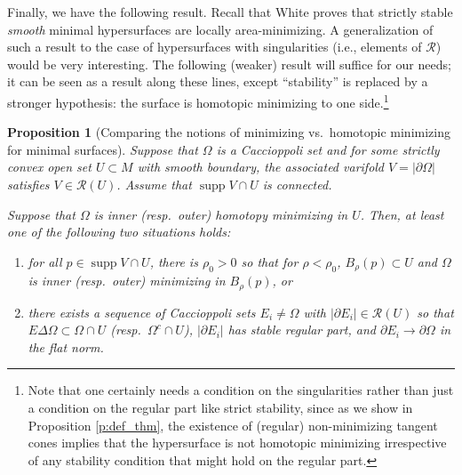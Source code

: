 \documentclass[12pt,twoside]{amsart}
\numberwithin{equation}{section}
\renewcommand{\mathbb}{\varmathbb}
\newtheorem{proposition}[theorem]{Proposition}
\newtheorem{remark}[theorem]{Remark}
\newcommand{\RR}{\mathbb{R}}
\newcommand{\cI}{\mathcal I}
\renewcommand{\cR}{\mathcal R}
\DeclareMathOperator{\supp}{supp}
\newcommand{\eps}{\varepsilon}
\begin{document}





Finally, we have the following result. Recall that White \cite{W} proves that strictly stable  \emph{smooth} minimal hypersurfaces are locally area-minimizing. A generalization of such a result to the case of hypersurfaces with singularities (i.e., elements of $\cR$) would be very interesting. The following (weaker) result will suffice for our needs; it can be seen as a result along these lines, except ``stability'' is replaced by a stronger hypothesis: the surface is homotopic minimizing to one side.\footnote{Note that one certainly needs a condition on the singularities rather than just a condition on the regular part like strict stability, since as we show in Proposition \ref{p:def_thm}, the existence of (regular) non-minimizing tangent cones implies that the hypersurface is not homotopic minimizing irrespective of any stability condition that might hold on the regular part.}

 \begin{proposition}[Comparing the notions of minimizing vs.\ homotopic minimizing for minimal surfaces]\label{prop:min-vs-htpy-min}
Suppose that $\Omega$ is a Caccioppoli set and for some strictly convex open set $U \subset M$ with smooth boundary, the associated varifold $V = |\partial \Omega|$ satisfies $V \in \cR(U)$. Assume that $\supp V \cap U$ is connected. 

Suppose that $\Omega$ is inner (resp.\ outer) homotopy minimizing in $U$. Then, at least one of the following two situations holds:
\begin{enumerate}
\item for all $p \in \supp V \cap U$, there is $\rho_0>0$ so that for $\rho<\rho_0$, $B_\rho(p) \subset U$ and $\Omega$ is inner (resp.\ outer) minimizing in $B_\rho(p)$, or
\item there exists a sequence of Caccioppoli sets $E_i
\neq \Omega$
with $|\partial E_i| \in \cR(U)$ so that $E \Delta \Omega \subset \Omega \cap U$ (resp.\ $\Omega^c \cap U$), $|\partial E_i|$ has stable regular part, and $\partial E_i \to \partial \Omega$ in the flat norm.  
\end{enumerate}
\end{proposition}
\end{document}
